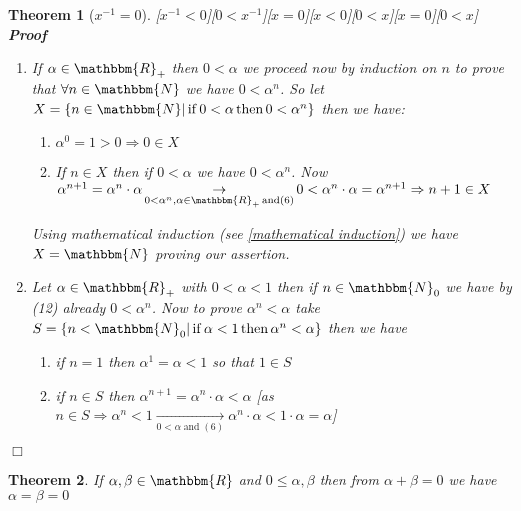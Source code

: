 \documentclass{book}
\newcommand{\Rightarrowlim}{\mathop{\rightarrow}\limits}
\newcommand{\tmop}[1]{\ensuremath{\operatorname{#1}}}
\newcommand{\upl}{+}
\newenvironment{proof}{\noindent\textbf{Proof\ }}{\hspace*{\fill}$\Box$\medskip}
\newtheorem{theorem}{Theorem}
\begin{document}
{{\begin{theorem}[$x^{- 1} = 0$][$x^{- 1} < 0$][$0 < x^{- 1}$][$x = 0$][$x <
0$][$0 < x$][$x = 0$][$0 < x$]
\begin{proof}
\begin{enumerate}
\begin{enumerate}
        \item then from $0 < x < y$ we have $x, y \in R_+$ and using (6) we
        get $x \cdot x < y \cdot x$ and $x \cdot y < y \cdot y$ giving $x
        \cdot x < y \cdot y \Rightarrow x^2 < y^2$
      \end{enumerate}
      \item If $\alpha \in \mathbbm{R}_+$ then $0 < \alpha$ we proceed now by
      induction on $n$ to prove that $\forall n \in \mathbbm{N}$ we have $0 <
      \alpha^n$. So let $X = \{ n \in \mathbbm{N}| \tmop{if} 0 < \alpha
      \tmop{then} 0 < \alpha^n \}$ then we have:
      \begin{enumerate}
        \item $\alpha^0 = 1 > 0 \Rightarrow 0 \in X$
        
        \item If $n \in X$ then if $0 < \alpha$ we have $0 < \alpha^n$. Now
        $\alpha^{n + 1} = \alpha^n \cdot \alpha \Rightarrowlim_{0 < \alpha^n,
        \alpha \in \mathbbm{R}_+ \tmop{and} (6)} 0 < \alpha^n \cdot \alpha =
        \alpha^{n \upl 1} \Rightarrow n \upl 1 \in X$
      \end{enumerate}
      Using mathematical induction (see \ref{mathematical induction}) we have
      $X =\mathbbm{N}$ proving our assertion.
      
      \item Let $\alpha \in \mathbbm{R}_+$ with $0 < \alpha < 1$ then if $n
      \in \mathbbm{N}_0$ we have by (12) already $0 < \alpha^n$. Now to prove
      $\alpha^n < \alpha$ take $S = \{ n <\mathbbm{N}_0 | \tmop{if} \alpha < 1
      \tmop{then} \alpha^n < \alpha \}$ then we have
      \begin{enumerate}
        \item if $n = 1$ then $\alpha^1 = \alpha < 1$ so that $1 \in S$
        
        \item if $n \in S$ then $\alpha^{n + 1} = \alpha^n \cdot \alpha <
        \alpha$ [as $n \in S \Rightarrow \alpha^n < 1 \Rightarrowlim_{0 <
        \alpha \tmop{and} (6)} \alpha^n \cdot \alpha < 1 \cdot \alpha =
        \alpha$]
      \end{enumerate}
      
    \end{enumerate}
  \end{proof}
\end{theorem}

\begin{theorem}
  \label{zero sum in R}If $\alpha, \beta \in \mathbbm{R}$ and $0 \leqslant
  \alpha, \beta$ then from $\alpha + \beta = 0$ we have $\alpha = \beta = 0$
\end{theorem}

}}
\end{document}
